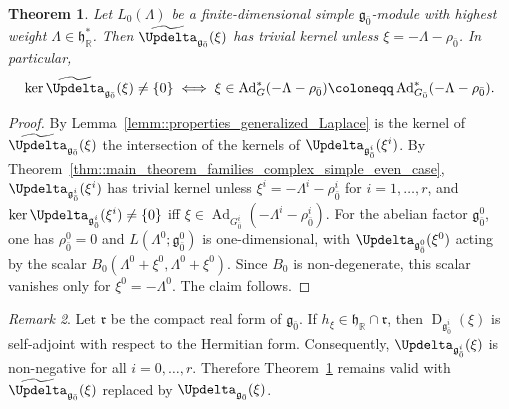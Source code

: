 \documentclass[11pt]{amsart}
\newcommand{\Ker}{\operatorname{ker}}
\newcommand{\Dirac}{\operatorname{D}}
\def\rr{{\mathfrak{r}}}
\def\RR{{\mathbb R}}
\def\hh{{\mathfrak h}}
\def\even{{\mathfrak{g}_{\bar{0}}}}
\def\gg{{\mathfrak{g}}}
\newcommand{\Ad}{\operatorname{Ad}}
\theoremstyle{plain}
\newtheorem{theorem}{Theorem}
\theoremstyle{remark}
\theoremstyle{definition}
\numberwithin{equation}{section}
\theoremstyle{remark}
\newtheorem{remark}[theorem]{Remark}
\begin{document}
\begin{theorem}\label{thm::main_family_even}
Let $L_{0}(\Lambda)$ be a finite-dimensional simple $\even$-module with highest weight
$\Lambda\in\hh_{\RR}^{\ast}$. Then $\widetilde{\Updelta}_{\even}(\xi)$ has trivial kernel unless
$\xi=-\Lambda-\rho_{\bar{0}}$. In particular,
\[
\Ker\widetilde{\Updelta}_{\even}(\xi)\neq\{0\}
\iff
\xi\in\Ad_{G}^{\ast}(-\Lambda-\rho_{\bar{0}})
\coloneqq \Ad_{G_{\bar{0}}}^{\ast}(-\Lambda-\rho_{\bar{0}}).
\]
\end{theorem}

\begin{proof}
By Lemma~\ref{lemm::properties_generalized_Laplace} is the kernel of $\widetilde{\Updelta}_{\even}(\xi)$ the intersection of the kernels of
$\Updelta_{\gg_{\bar{0}}^{i}}(\xi^{i})$. By
Theorem~\ref{thm::main_theorem_families_complex_simple_even_case},
$\Updelta_{\gg_{\bar{0}}^{i}}(\xi^{i})$ has trivial kernel unless
$\xi^{i}=-\Lambda^{i}-\rho_{\bar{0}}^{i}$ for $i=1,\ldots,r$, and
$\ker\Updelta_{\gg_{\bar{0}}^{i}}(\xi^{i})\neq\{0\}$ iff
$\xi\in\Ad_{G_{\bar{0}}^{i}}(-\Lambda^{i}-\rho_{\bar{0}}^{i})$. For the abelian
factor $\gg_{\bar{0}}^{0}$, one has $\rho_{\bar{0}}^{0}=0$ and
$L(\Lambda^{0};\gg_{\bar{0}}^{0})$ is one-dimensional, with
$\Updelta_{\gg_{\bar{0}}^{0}}(\xi^{0})$ acting by the scalar
$B_{0}(\Lambda^{0}+\xi^{0},\Lambda^{0}+\xi^{0})$. Since $B_{0}$ is non-degenerate,
this scalar vanishes only for $\xi^{0}=-\Lambda^{0}$. The claim follows.
\end{proof}

\begin{remark}
Let $\rr$ be the compact real form of $\even$. If $h_{\xi}\in \hh_{\RR}\cap \rr$, then $\Dirac_{\gg_{\bar{0}}^{i}}(\xi)$ is self-adjoint with respect to the Hermitian form. Consequently, $\Updelta_{\gg_{\bar{0}}^{i}}(\xi)$ is non-negative for all $i=0,\ldots,r$. Therefore Theorem~\ref{thm::main_family_even} remains valid with $\widetilde{\Updelta}_{\even}(\xi)$ replaced by $\Updelta_{\even}(\xi)$.
\end{remark}
\end{document}
